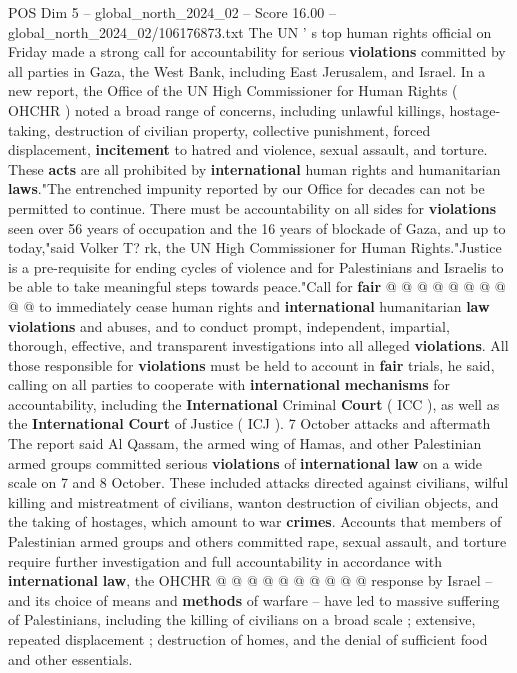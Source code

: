 \begin{textsample}{POS Dim 5 – global\_north\_2024\_02 – Score 16.00 – global\_north\_2024\_02/106176873.txt}  \label{ex:f5_pos_249}
The UN ' s top human rights official on Friday made a strong call for accountability for serious \textbf{violations} committed by all parties in Gaza, the West Bank, including East Jerusalem, and Israel.
In a new report, the Office of the UN High Commissioner for Human Rights ( OHCHR ) noted a broad range of concerns, including unlawful killings, hostage-taking, destruction of civilian property, collective punishment, forced displacement, \textbf{incitement} to hatred and violence, sexual assault, and torture.
These \textbf{acts} are all prohibited by \textbf{international} human rights and humanitarian \textbf{laws}."The entrenched impunity reported by our Office for decades can not be permitted to continue.
There must be accountability on all sides for \textbf{violations} seen over 56 years of occupation and the 16 years of blockade of Gaza, and up to today,"said Volker T? rk, the UN High Commissioner for Human Rights."Justice is a pre-requisite for ending cycles of violence and for Palestinians and Israelis to be able to take meaningful steps towards peace."Call for \textbf{fair} @ @ @ @ @ @ @ @ @ @ to immediately cease human rights and \textbf{international} humanitarian \textbf{law} \textbf{violations} and abuses, and to conduct prompt, independent, impartial, thorough, effective, and transparent investigations into all alleged \textbf{violations}.
All those responsible for \textbf{violations} must be held to account in \textbf{fair} trials, he said, calling on all parties to cooperate with \textbf{international} \textbf{mechanisms} for accountability, including the \textbf{International} Criminal \textbf{Court} ( ICC ), as well as the \textbf{International} \textbf{Court} of Justice ( ICJ ). 7 October attacks and aftermath The report said Al Qassam, the armed wing of Hamas, and other Palestinian armed groups committed serious \textbf{violations} of \textbf{international} \textbf{law} on a wide scale on 7 and 8 October.
These included attacks directed against civilians, wilful killing and mistreatment of civilians, wanton destruction of civilian objects, and the taking of hostages, which amount to war \textbf{crimes}.
Accounts that members of Palestinian armed groups and others committed rape, sexual assault, and torture require further investigation and full accountability in accordance with \textbf{international} \textbf{law}, the OHCHR @ @ @ @ @ @ @ @ @ @ response by Israel -- and its choice of means and \textbf{methods} of warfare -- have led to massive suffering of Palestinians, including the killing of civilians on a broad scale ; extensive, repeated displacement ; destruction of homes, and the denial of sufficient food and other essentials.

\end{textsample}
